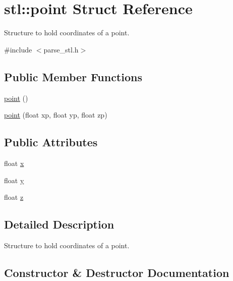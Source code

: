 \hypertarget{structstl_1_1point}{}\section{stl\+:\+:point Struct Reference}
\label{structstl_1_1point}


Structure to hold coordinates of a point.  




{\ttfamily \#include $<$parse\+\_\+stl.\+h$>$}

\subsection*{Public Member Functions}
\begin{DoxyCompactItemize}
\item 
\mbox{\hyperlink{structstl_1_1point_a1f4c5480ba382f2a01949825935ef836}{point}} ()
\item 
\mbox{\hyperlink{structstl_1_1point_a11d525a49dfad0dfb950d990ce258570}{point}} (float xp, float yp, float zp)
\end{DoxyCompactItemize}
\subsection*{Public Attributes}
\begin{DoxyCompactItemize}
\item 
float \mbox{\hyperlink{structstl_1_1point_a346ae3ec6b455412446d88d9a6d2f46f}{x}}
\item 
float \mbox{\hyperlink{structstl_1_1point_af010147291568343ad5736eccd2318d4}{y}}
\item 
float \mbox{\hyperlink{structstl_1_1point_aa72d43418ec8747b27a97b1e4935c67d}{z}}
\end{DoxyCompactItemize}


\subsection{Detailed Description}
Structure to hold coordinates of a point. 

\subsection{Constructor \& Destructor Documentation}
\mbox{\label{structstl_1_1point_a1f4c5480ba382f2a01949825935ef836}} 
